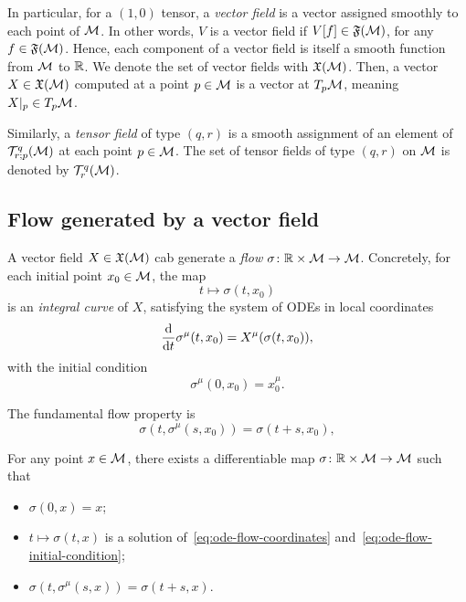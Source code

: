 In particular, for a $(1,0)$ tensor, a \emph{vector field} is a vector assigned smoothly to each point of $\mathcal{M}$. In other words, $V$ is a vector field if $V[f] \in \mathfrak{F}(\mathcal{M})$, for any $f \in \mathfrak{F}(\mathcal{M})$. Hence, each component of a vector field is itself a smooth function from $\mathcal{M}$ to $\mathbb{R}$. We denote the set of vector fields with $\mathfrak{X}(\mathcal{M})$. Then, a vector $X \in \mathfrak{X}(\mathcal{M})$ computed at a point $p \in \mathcal{M}$ is a vector at $T_p \mathcal{M}$, meaning $X|_p \in T_p \mathcal{M}$.

Similarly, a \emph{tensor field} of type $(q,r)$ is a smooth assignment of an element of $\mathcal{T}^q_{r;p}(\mathcal{M})$ at each point $p \in \mathcal{M}$. The set of tensor fields of type $(q,r)$ on $\mathcal{M}$ is denoted by $\mathcal{T}^q_r(\mathcal{M})$.

\subsection{Flow generated by a vector field}
A vector field $X \in \mathfrak{X}(\mathcal{M})$ cab generate a \emph{flow} $\sigma \colon \mathbb{R} \times \mathcal{M} \to \mathcal{M}$. Concretely, for each initial point $x_0 \in \mathcal{M}$, the map
\begin{equation}
    t \mapsto \sigma(t, x_0)
\end{equation}
is an \emph{integral curve} of $X$, satisfying the system of ODEs in local coordinates
\begin{equation}\label{eq:ode-flow-coordinates}
	\frac{\mathop{}\!\mathrm{d}}{\mathop{}\!\mathrm{d} t} \sigma^\mu (t,x_0) = X^\mu (\sigma(t,x_0)),
\end{equation}
with the initial condition
\begin{equation}\label{eq:ode-flow-initial-condition}
	\sigma^\mu(0,x_0) = x^\mu_0.
\end{equation}

The fundamental flow property is
\begin{equation}\label{eq:property-flow}
	\sigma(t, \sigma^\mu(s,x_0)) = \sigma(t+s,x_0),
\end{equation}

\begin{theorem}
	For any point $x \in \mathcal{M}$, there exists a differentiable map $\sigma \colon \mathbb{R} \times \mathcal{M} \to \mathcal{M}$ such that
	\begin{itemize}
		\item $\sigma(0,x) = x$;
		\item $t \mapsto \sigma(t,x)$ is a solution of~\eqref{eq:ode-flow-coordinates} and~\eqref{eq:ode-flow-initial-condition};
		\item $\sigma(t,\sigma^\mu(s,x)) = \sigma(t+s,x)$.
	\end{itemize}
\end{theorem}


